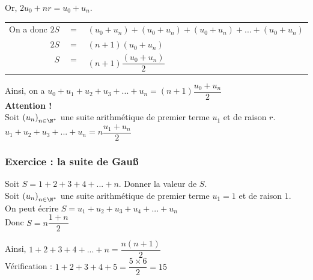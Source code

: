 Or, $2u_0 + nr = u_0 + u_n$. \\ 

\begin{tabular}{rll}
On a donc $2S$ & $=$ & $\left(u_0 + u_n\right) + \left(u_0 + u_n\right) + \left(u_0 + u_n\right) + ... + \left(u_0 + u_n\right)$ \vspace*{.3cm} \\
$2S$ & $ = $ & $ \left(n+1\right)\left(u_0 + u_n\right)$ \vspace*{.3cm} \\
$S$ & $=$ & $\left(n+1\right)\dfrac{\left(u_0 + u_n\right)}{2}$ \vspace*{.3cm} \\
\end{tabular}

\vspace*{.3cm} 

Ainsi, on a $u_0 + u_1 + u_2 + u_3 + ... + u_n = \left(n+1\right) \dfrac{u_0 + u_n}{2}$ \\

\textbf{Attention !} \\

Soit $\left(u_n\right)_{n\in \N^*}$ une suite arithmétique de premier terme $u_1$ et de raison $r$. \\

$u_1 + u_2 + u_3 + ... + u_n = n\dfrac{u_1 + u_n}{2}$

\newpage

\subsubsection{Exercice  : la suite de Gauß}

Soit $S = 1 + 2 + 3 + 4 + ... + n$. Donner la valeur de $S$. \\

Soit $\left(u_n\right)_{n \in \N^*}$ une suite arithmétique de premier terme $u_1 = 1$ et de raison $1$. \\

On peut écrire $ S = u_1 + u_2 + u_3 + u_4 + ... + u_n$ \\

Donc $S = n\dfrac{1+n}{2}$ 

Ainsi, $1 + 2+ 3 + 4 + ... + n = \dfrac{n\left(n+1\right)}{2}$ \\

Vérification : $1 + 2 + 3 + 4 + 5 = \dfrac{5 \times 6}{2} = 15$ \\


